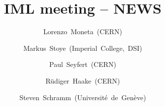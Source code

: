 \author[~]{Lorenzo~Moneta~(CERN)\and
 Markus~Stoye~(Imperial~College,~DSI)\and
 Paul~Seyfert~(CERN)\and
 Rüdiger~Haake~(CERN)\and
 Steven~Schramm~(Université~de~Genève)}
\institute[]{}
\date[\today]{}
\title{IML meeting -- NEWS}
